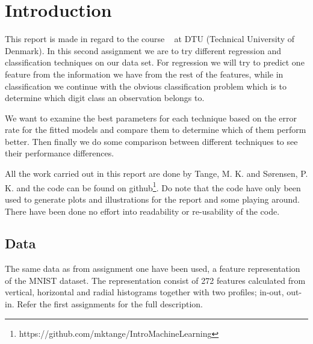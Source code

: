 \chapter{Introduction}
This report is made in regard to the course \textsf{\courseno\ \coursename} at DTU (Technical University of Denmark). In this second assignment we are to try different regression and classification techniques on our data set. For regression we will try to predict one feature from the information we have from the rest of the features, while in classification we continue with the obvious classification problem which is to determine which digit class an observation belongs to. 

We want to examine the best parameters for each technique based on the error rate for the fitted models and compare them to determine which of them perform better. Then finally we do some comparison between different techniques to see their performance differences.


All the work carried out in this report are done by Tange, M. K. and Sørensen, P. K. and the code can be found on github\footnote{https://github.com/mktange/IntroMachineLearning}. Do note that the code have only been used to generate plots and illustrations for the report and some playing around. There have been done no effort into readability or re-usability of the code.

\section{Data}
The same data as from assignment one have been used, a feature representation of the MNIST dataset. The representation consist of 272 features calculated from vertical, horizontal and radial histograms together with two profiles; in-out, out-in. Refer the first assignments for the full description. 